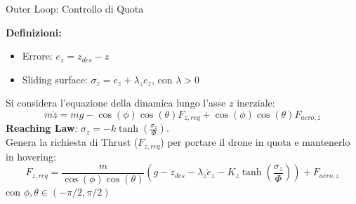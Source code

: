\documentclass[aspectratio=169]{beamer} %
\begin{document}
\begin{frame}{Outer Loop: Controllo di Quota}

    \vspace{0.2cm}
    \textbf{Definizioni:}
    \begin{itemize}
        \item Errore: $e_z = z_{des} - z$
        \item Sliding surface: $\sigma_z = \dot{e}_z + \lambda_z e_z$, con $\lambda > 0$
    \end{itemize}
    \vspace{0.3cm}
    Si considera l'equazione della dinamica lungo l'asse $z$ inerziale:
    \begin{equation}
        m\ddot{z} = mg - \cos(\phi)\cos(\theta) F_{z,req} + \cos(\phi)\cos(\theta) F_{aero,z}
    \end{equation}
    \textbf{Reaching Law}: $\dot{\sigma_z} = -k \tanh\left( \frac{\sigma_z}{\Phi} \right)$.
    \vspace{0.1cm}
    \\Genera la richiesta di Thrust ($F_{z,req}$) per portare il drone in quota e mantenerlo in hovering:
    \begin{equation}
        F_{z,req} = \frac{m}{\cos(\phi) \cos(\theta)} \left(g - \ddot{z}_{des} - \lambda_z \dot{e}_z - K_z \tanh\left(\frac{\sigma_z}{\Phi}\right) \right) + F_{aero,z}
    \end{equation}
    con $\phi, \theta \in (-\pi/2, \pi/2)$

\end{frame}
\end{document}
